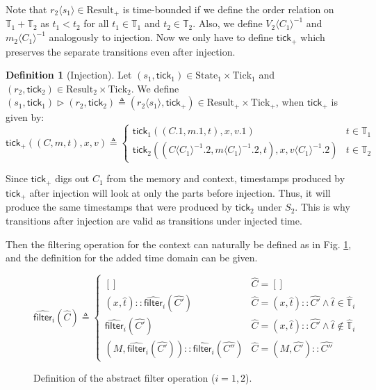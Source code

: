 \documentclass{article}
\theoremstyle{definition}
\newtheorem{definition}{Definition}[section]
\newcommand*{\cons}{::}
\newcommand*{\A}[1]{\widehat{#1}}
\newcommand*{\Time}{\mathbb{T}}
\newcommand*{\mem}{m}
\newcommand*{\State}{\text{State}}
\newcommand*{\Result}{\text{Result}}
\newcommand*{\Tick}{\text{Tick}}
\newcommand*{\tick}{\mathsf{tick}}
\newcommand*{\inject}[2]{{#2}\langle{#1}\rangle}
\newcommand*{\delete}[2]{{#2}{\langle{#1}\rangle}^{-1}}
\newcommand*{\filter}{\mathsf{filter}}
\begin{document}
Note that $\inject{s_1}{r_2}\in\Result_+$ is time-bounded if we define the order relation on $\Time_1+\Time_2$ as $t_1<t_2$ for all $t_1\in\Time_1$ and $t_2\in\Time_2$.
Also, we define $\delete{C_1}{V_2}$ and $\delete{C_1}{\mem_2}$ analogously to injection.
Now we only have to define $\tick_+$ which preserves the separate transitions even after injection.

\begin{definition}[Injection]
  Let $(s_1,\tick_1)\in\State_1\times\Tick_1$ and $(r_2,\tick_2)\in\Result_2\times\Tick_2$.
  We define $(s_1,\tick_1)\rhd(r_2,\tick_2)\triangleq(\inject{s_1}{r_2},\tick_+)\in\Result_+\times\Tick_+$, when $\tick_+$ is given by:
  \[
    \tick_+((C,\mem,t),x,v)\triangleq
    \begin{cases}
      \tick_1((C.1,\mem.1,t),x,v.1)                                           & t\in\Time_1 \\
      \tick_2((\delete{C_1}{C}.2,\delete{C_1}{\mem}.2,t),x,\delete{C_1}{v}.2) & t\in\Time_2
    \end{cases}
  \]
\end{definition}

Since $\tick_+$ digs out $C_1$ from the memory and context, timestamps produced by $\tick_+$ after injection will look at only the parts before injection.
Thus, it will produce the same timestamps that were produced by $\tick_2$ under $S_2$.
This is why transitions after injection are valid as transitions under injected time.

Then the filtering operation for the context can naturally be defined as in Fig. \ref{fig:absfilter}, and the definition for the added time domain can be given.
\begin{figure}[h!]
  \[
    \A\filter_i(\A{C})\triangleq
    \begin{cases}
      []                                               & \A{C}=[]                                                \\
      (x,\A{t})\cons\A\filter_i(\A{C'})                & \A{C}=(x,\A{t})\cons \A{C'}\wedge \A{t}\in\A\Time_i     \\
      \A\filter_i(\A{C'})                              & \A{C}=(x,\A{t})\cons \A{C'}\wedge \A{t}\not\in\A\Time_i \\
      (M,\A\filter_i(\A{C'}))\cons\A\filter_i(\A{C''}) & \A{C}=(M, \A{C'})\cons \A{C''}
    \end{cases}
  \]
  \caption{Definition of the abstract filter operation ($i=1,2$).}
  \label{fig:absfilter}
\end{figure}
\end{document}

